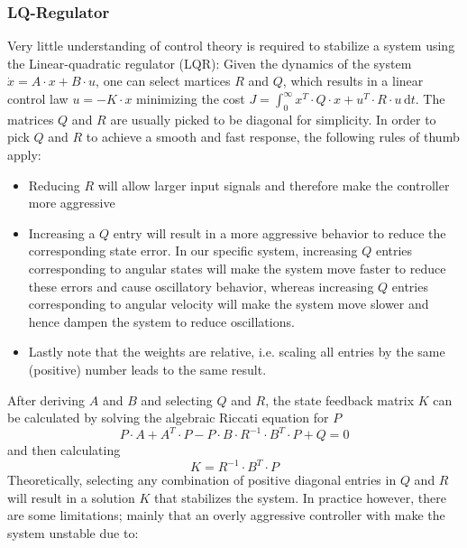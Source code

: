 \documentclass{article}
\begin{document}
\subsubsection{LQ-Regulator}
\label{ss:lqr}
Very little understanding of control theory is required to stabilize a system using the Linear-quadratic regulator (LQR):
Given the dynamics of the system $\dot{x} = A \cdot x + B \cdot u$, one can select martices $R$ and $Q$, which results in a linear control law $u = -K \cdot x$ minimizing the cost $J = \int_0^{\infty} x^T \cdot Q \cdot x + u^T \cdot R \cdot u \, \mathrm{d}t$.
The matrices $Q$ and $R$ are usually picked to be diagonal for simplicity.
In order to pick $Q$ and $R$ to achieve a smooth and fast response, the following rules of thumb apply:
\begin{itemize}
	\item Reducing $R$ will allow larger input signals and therefore make the controller more aggressive
	\item Increasing a $Q$ entry will result in a more aggressive behavior to reduce the corresponding state error.
	In our specific system, increasing $Q$ entries corresponding to angular states will make the system move faster to reduce these errors and cause oscillatory behavior, whereas increasing $Q$ entries corresponding to angular velocity will make the system move slower and hence dampen the system to reduce oscillations.
	\item Lastly note that the weights are relative, i.e. scaling all entries by the same (positive) number leads to the same result.
\end{itemize}
After deriving $A$ and $B$ and selecting $Q$ and $R$, the state feedback matrix $K$ can be calculated by solving the algebraic Riccati equation for $P$
\begin{equation}
P \cdot A + A^T \cdot P - P \cdot B \cdot R^{-1} \cdot B^T \cdot P + Q = 0
\label{eq:lqrP}
\end{equation}
and then calculating
\begin{equation}
K = R^{-1} \cdot B^T \cdot P
\label{eq:lqrK}
\end{equation}
Theoretically, selecting any combination of positive diagonal entries in $Q$ and $R$ will result in a solution $K$ that stabilizes the system.
In practice however, there are some limitations; mainly that an overly aggressive controller with make the system unstable due to:
\end{document}
